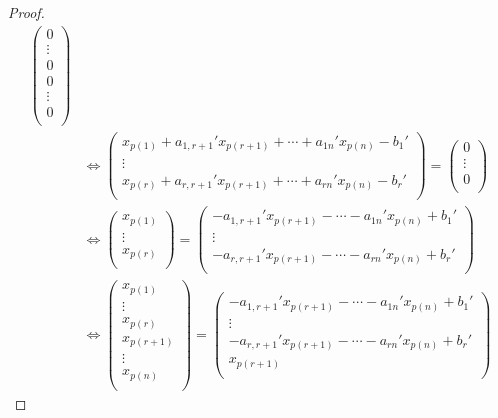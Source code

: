 \documentclass[dvipdfmx]{jsarticle}
\begin{document}
\begin{proof}
\begin{align*}
\begin{pmatrix}
0 \\
 \vdots \\
0 \\
0 \\
 \vdots \\
0 \\
\end{pmatrix}\\
&\Leftrightarrow \begin{pmatrix}
x_{p(1)} + a_{1,r + 1}'x_{p(r + 1)} + \cdots + a_{1n}'x_{p(n)} - b_{1}' \\
 \vdots \\
x_{p(r)} + a_{r,r + 1}'x_{p(r + 1)} + \cdots + a_{rn}'x_{p(n)} - b_{r}' \\
\end{pmatrix} = \begin{pmatrix}
0 \\
 \vdots \\
0 \\
\end{pmatrix}\\
&\Leftrightarrow \begin{pmatrix}
x_{p(1)} \\
 \vdots \\
x_{p(r)} \\
\end{pmatrix} = \begin{pmatrix}
 - a_{1,r + 1}'x_{p(r + 1)} - \cdots - a_{1n}'x_{p(n)} + b_{1}' \\
 \vdots \\
 - a_{r,r + 1}'x_{p(r + 1)} - \cdots - a_{rn}'x_{p(n)} + b_{r}' \\
\end{pmatrix}\\
&\Leftrightarrow \begin{pmatrix}
x_{p(1)} \\
 \vdots \\
x_{p(r)} \\
x_{p(r + 1)} \\
 \vdots \\
x_{p(n)} \\
\end{pmatrix} = \begin{pmatrix}
 - a_{1,r + 1}'x_{p(r + 1)} - \cdots - a_{1n}'x_{p(n)} + b_{1}' \\
 \vdots \\
 - a_{r,r + 1}'x_{p(r + 1)} - \cdots - a_{rn}'x_{p(n)} + b_{r}' \\
x_{p(r + 1)} \\

\end{pmatrix}
\end{align*}
\end{proof}
\end{document}

